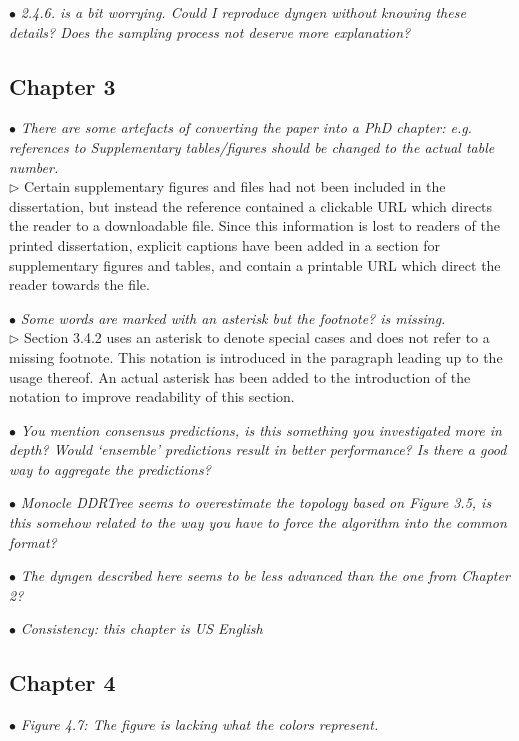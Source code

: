 \documentclass[10pt]{article}
\newcommand{\exam}[2][\  ]{\hspace{0pt}\marginpar{\color{red}#1}$\bullet$ \textit{#2}}
\newcommand{\answ}[1]{{\color{blue} $\triangleright$ #1}}
\newcommand{\tagtime}{{\Large $\hourglass$}}
\begin{document}
{\exam{2.4.6. is a bit worrying. Could I reproduce dyngen without knowing these
		details? Does the sampling process not deserve more explanation?}
	



\subsection{Chapter 3}

\exam{There are some artefacts of converting the paper into a PhD chapter: e.g.
	references to Supplementary tables/figures should be changed to the actual
	table number.} \\
\answ{Certain supplementary figures and files had not been included in the dissertation, but instead the reference contained a clickable URL which directs the reader to a downloadable file. Since this information is lost to readers of the printed dissertation, explicit captions have been added in a section for supplementary figures and tables, and contain a printable URL which direct the reader towards the file.}

\exam{Some words are marked with an asterisk but the footnote? is
	missing.} \\
\answ{Section 3.4.2 uses an asterisk to denote special cases and does not refer to a missing footnote. This notation is introduced in the paragraph leading up to the usage thereof. An actual asterisk has been added to the introduction of the notation to improve readability of this section.}

\exam{You mention consensus predictions, is this something you investigated more
		in depth? Would ‘ensemble’ predictions result in better performance? Is there
		a good way to aggregate the predictions?}

\exam{Monocle DDRTree seems to overestimate the topology based on Figure 3.5, is
	this somehow related to the way you have to force the algorithm into the
	common format?}

\exam{The dyngen described here seems to be less advanced than the one from
		Chapter 2?}

\exam[\tagtime]{Consistency: this chapter is US English}


\subsection{Chapter 4}

\exam{Figure 4.7: The figure is lacking what the colors represent.}

}
\end{document}
